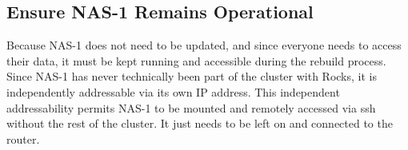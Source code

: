 \documentclass[12pt]{article}
\begin{document}
%
%
%
%
%
%


\subsection{Ensure NAS-1 Remains Operational}

\qq Because NAS-1 does not need to be updated, and since everyone needs to
access their data, it must be kept running and accessible during the rebuild
process. Since NAS-1 has never technically been part of the cluster with Rocks,
it is independently addressable via its own IP address. This independent
addressability permits NAS-1 to be mounted and remotely accessed via ssh
without the rest of the cluster. It just needs to be left on and connected to
the router.
\end{document}
